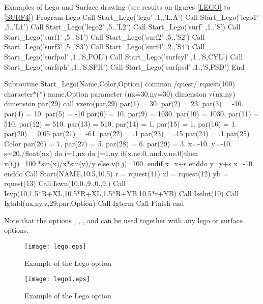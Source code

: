 \vfill
\clearpage

\begin{XMPt}{Examples of Lego and Surface drawing 
             (see results on figures \ref{LEGO} to \ref{SURF4})}
      Program Lego 
      Call Start_Lego('lego'    ,1.,'L,A')
      Call Start_Lego('lego1'   ,5.,'L1')
      Call Start_Lego('lego2'   ,5.,'L2')
      Call Start_Lego('surf'    ,1.,'S')
      Call Start_Lego('surf1'   ,5.,'S1')
      Call Start_Lego('surf2'   ,5.,'S2')
      Call Start_Lego('surf3'   ,5.,'S3')
      Call Start_Lego('surf4'   ,2.,'S4')
      Call Start_Lego('surfpol' ,1.,'S,POL')
      Call Start_Lego('surfcyl' ,1.,'S,CYL')
      Call Start_Lego('surfsph' ,1.,'S,SPH')
      Call Start_Lego('surfpsd' ,1.,'S,PSD')
      End

      Subroutine Start_Lego(Name,Color,Option)
      common /quest/ rquest(100)
      character*(*) name,Option
      parameter (nx=30,ny=30)
      dimension v(nx,ny)
      dimension par(29)
      call vzero(par,29)
      par(1)  = 30.
      par(2)  = 23.
      par(3)  = -10.
      par(4)  = 10.
      par(5)  = -10
      par(6)  = 10.
      par(9)  = 1030.
      par(10) = 1030.
      par(11) = 510.
      par(12) = 510.
      par(13) = 510.
      par(14) = 1.
      par(15) = 1.
      par(16) = 1.
      par(20) = 0.05
      par(21) = -61.
      par(22) = .1
      par(23) = .15
      par(24) = .1
      par(25) = Color
      par(26) = 7.
      par(27) = 5.
      par(28) = 6.
      par(29) = 3.
      x=-10.
      y=-10.
      s=20./float(nx)
      do i=1,nx
         do j=1,ny
            if(x.ne.0..and.y.ne.0)then
               v(i,j)=100.*sin(x)/x*sin(y)/y
            else
               v(i,j)=100.
            endif
            x=x+s
         enddo
         y=y+s
         x=-10.
      enddo
      Call Start(NAME,10.5,10.5)
      r  = rquest(11)
      xl = rquest(12)
      yb = rquest(13)
      Call Iswn(10,0.,9.,0.,9.)
      Call Isvp(10,1.5*R+XL,10.5*R+XL,1.5*R+YB,10.5*r+YB)
      Call Iselnt(10)
      Call Igtabl(nx,ny,v,29,par,Option)
      Call Igterm
      Call Finish
      end
\end{XMPt}

Note that the options , , , and  can be
used together with any lego or surface options.

\clearpage

\begin{figure}[p]
\begin{center}
\texttt{[image: lego.eps]}
\end{center}
\caption{Example of the \protect{} Lego option}
\label{LEGO}
\begin{center}
\texttt{[image: lego1.eps]}
\end{center}
\caption{Example of the \protect{} Lego \protect{} option}
\label{LEGO1}
\end{figure}

